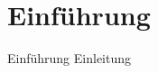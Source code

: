 
{
    \section{Einführung}
}

\begin{frame}{Einführung}
    Einleitung
    \cite{bothSolidBasedB2BData2025,mecklerWebLinkedData2023,mollerIndustrialDataEcosystems2024,sambraSolidPlatformDecentralized2016}
\end{frame}
